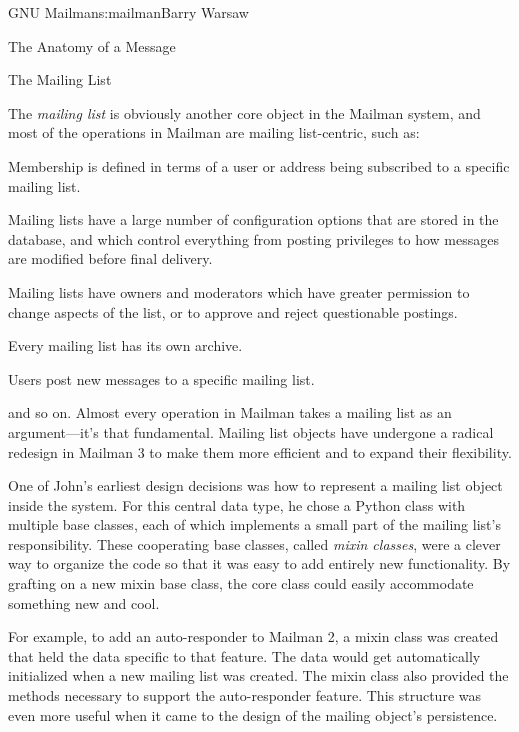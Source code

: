 \begin{aosachapter}{GNU Mailman}{s:mailman}{Barry Warsaw}
\begin{aosasect1}{The Anatomy of a Message}
\end{aosasect1}

\begin{aosasect1}{The Mailing List}

The \emph{mailing list} is obviously another core object in the
Mailman system, and most of the operations in Mailman are mailing
list-centric, such as:

\begin{aosaitemize}

\item Membership is defined in terms of a user or address being
  subscribed to a specific mailing list.

\item Mailing lists have a large number of configuration options that
  are stored in the database, and which control everything from
  posting privileges to how messages are modified before final
  delivery.

\item Mailing lists have owners and moderators which have greater
  permission to change aspects of the list, or to approve and reject
  questionable postings.

\item Every mailing list has its own archive.

\item Users post new messages to a specific mailing list.

\end{aosaitemize}

\noindent
and so on.  Almost every operation in Mailman takes a mailing list as
an argument---it's that fundamental.  Mailing list objects have
undergone a radical redesign in Mailman 3 to make them more efficient
and to expand their flexibility.

One of John's earliest design decisions was how to represent a mailing
list object inside the system.  For this central data type, he chose a
Python class with multiple base classes, each of which implements a
small part of the mailing list's responsibility.  These cooperating
base classes, called \emph{mixin classes}, were a clever way to
organize the code so that it was easy to add entirely new
functionality.  By grafting on a new mixin base class, the core
 class could easily accommodate something new and cool.

For example, to add an auto-responder to Mailman 2, a mixin class was
created that held the data specific to that feature. The data would get
automatically initialized when a new mailing list was created.  The
mixin class also provided the methods necessary to support the
auto-responder feature.  
This structure was even more useful when it came to the design of the
mailing  object's persistence.  


\end{aosasect1}
\end{aosachapter}

